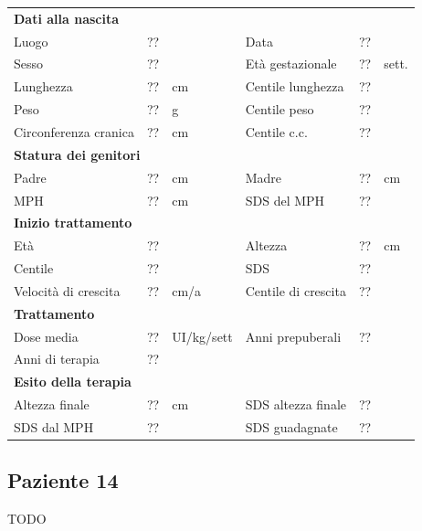 \begin{table}[!h]
\begin{tabular}{lrllrl}
\toprule
\multicolumn{6}{l}{\textbf{Dati alla nascita}}\\
Luogo 		& \multicolumn{2}{l}{??} 	& Data 					& \multicolumn{2}{l}{??} 	\\
Sesso 		& \multicolumn{2}{l}{??} 	& Età gestazionale 		& ?? 		& sett.\\
Lunghezza 	& ?? 		& cm 				& Centile lunghezza		& ?? 		\\
Peso 		& ?? 		& g					& Centile peso			& ?? 		\\
Circonferenza cranica	& ?? 		& cm 	& Centile c.c.			& ?? \\
\midrule
\multicolumn{6}{l}{\textbf{Statura dei genitori}}\\
Padre 		& ?? & cm 	& Madre 				& ?? & cm \\
MPH 		& ?? & cm 	& SDS del MPH 			& ??\\
\midrule
\multicolumn{6}{l}{\textbf{Inizio trattamento}} \\
Età	& ?? & 		& Altezza 				& ?? & cm  \\
Centile & ?? 	 &		& SDS		& ?? \\
Velocità di crescita & ?? & cm/a	& Centile di crescita & ??\\
\midrule
\multicolumn{6}{l}{\textbf{Trattamento}} \\
Dose media		& ?? & UI/kg/sett & Anni prepuberali & ??\\
Anni di terapia & ??\\
\midrule
\multicolumn{6}{l}{\textbf{Esito della terapia}} \\
Altezza finale			& ?? & cm 	& SDS altezza finale		& ??\\
SDS dal MPH				& ?? &		& SDS guadagnate 			& ??\\
\bottomrule
\end{tabular}
\end{table}
\clearpage


\subsection*{Paziente 14}

TODO

